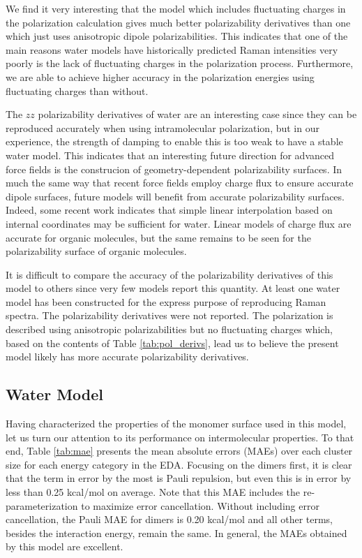 \documentclass[journal=jacsat,manuscript=article]{achemso}
\begin{document}
We find it very interesting that the model which includes fluctuating charges in the polarization
calculation gives much better polarizability derivatives than one which just uses anisotropic dipole
polarizabilities. This indicates that one of the main reasons water models have historically
predicted Raman intensities very poorly\cite{hamm20142d} is the lack of fluctuating charges in the
polarization process. Furthermore, we are able to achieve higher accuracy in the polarization energies
using fluctuating charges than without.

The $zz$ polarizability derivatives of water are an interesting case
since they can be reproduced accurately when using intramolecular polarization, but in our experience, the strength
of damping to enable this is too weak to have a stable water model. This indicates that an
interesting future direction for advanced force fields is the construcion of geometry-dependent
polarizability surfaces. In much the same way that recent force fields employ
charge flux to ensure accurate dipole surfaces, future models will benefit from
accurate polarizability surfaces. Indeed, some recent work indicates that
simple linear interpolation based on internal coordinates may be sufficient for water.\cite{herman2023accurate}
Linear models of charge flux are accurate for organic molecules\cite{sedghamiz2017probing,yang2020accurate},
but the same remains to be seen for the polarizability surface of organic molecules.

It is difficult to compare the accuracy of the polarizability derivatives of this model
to others since very few models report this quantity. At least one water model has been constructed
for the express purpose of reproducing Raman spectra.\cite{sidler2018efficient}
The polarizability derivatives were not reported. The polarization is described using
anisotropic polarizabilities but no fluctuating charges which, based on the contents of
Table \ref{tab:pol_derivs}, lead us to believe the present model likely has more accurate
polarizability derivatives.

\subsection*{Water Model}

Having characterized the properties of the monomer surface used in this model, let
us turn our attention to its performance on intermolecular properties. To that end, Table \ref{tab:mae}
presents the mean absolute errors (MAEs) over each cluster size for each
energy category in the EDA. Focusing on the dimers first, it is clear that the term
in error by the most is Pauli repulsion, but even this is in error by less than 0.25 kcal/mol
on average. Note that this MAE includes the re-parameterization to maximize error cancellation.
Without including error cancellation, the Pauli MAE for dimers is 0.20 kcal/mol and all other terms,
besides the interaction energy, remain the same. In general, the MAEs obtained by this model are
excellent.
\end{document}
